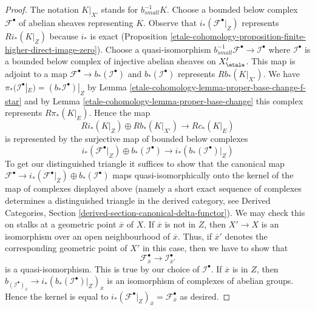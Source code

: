\begin{proof}
The notation $K|_{X'}$ stands for $b_{small}^{-1}K$.
Choose a bounded below complex $\mathcal{F}^\bullet$
of abelian sheaves representing $K$. Observe that
$i_*(\mathcal{F}^\bullet|_Z)$ represents $Ri_*(K|_Z)$
because $i_*$ is exact
(Proposition \ref{etale-cohomology-proposition-finite-higher-direct-image-zero}).
Choose a quasi-isomorphism
$b_{small}^{-1}\mathcal{F}^\bullet \to \mathcal{I}^\bullet$
where $\mathcal{I}^\bullet$ is a bounded below complex of injective
abelian sheaves on $X'_\etale$. This map is adjoint to a map
$\mathcal{F}^\bullet \to b_*(\mathcal{I}^\bullet)$ and
$b_*(\mathcal{I}^\bullet)$ represents $Rb_*(K|_{X'})$.
We have $\pi_*(\mathcal{I}^\bullet|_E) = (b_*\mathcal{I}^\bullet)|_Z$
by Lemma \ref{etale-cohomology-lemma-proper-base-change-f-star} and by
Lemma \ref{etale-cohomology-lemma-proper-base-change} this complex represents
$R\pi_*(K|_E)$. Hence the map
$$
Ri_*(K|_Z) \oplus Rb_*(K|_{X'}) \to Rc_*(K|_E)
$$
is represented by the surjective map of bounded below complexes
$$
i_*(\mathcal{F}^\bullet|_Z) \oplus
b_*(\mathcal{I}^\bullet)
\to
i_*\left(b_*(\mathcal{I}^\bullet)|_Z\right)
$$
To get our distinguished triangle it suffices to show that
the canonical map
$\mathcal{F}^\bullet \to i_*(\mathcal{F}^\bullet|_Z) \oplus
b_*(\mathcal{I}^\bullet)$
maps quasi-isomorphically onto the kernel of the map
of complexes displayed above (namely a short exact sequence
of complexes determines a distinguished triangle in the derived
category, see
Derived Categories, Section \ref{derived-section-canonical-delta-functor}).
We may check this on stalks at a geometric point $\overline{x}$ of $X$.
If $\overline{x}$ is not in $Z$, then $X' \to X$ is an isomorphism
over an open neighbourhood of $\overline{x}$. Thus, if $\overline{x}'$
denotes the corresponding geometric point of $X'$ in this case, then
we have to show that
$$
\mathcal{F}^\bullet_{\overline{x}} \to \mathcal{I}^\bullet_{\overline{x}'}
$$
is a quasi-isomorphism. This is true by our choice of $\mathcal{I}^\bullet$.
If $\overline{x}$ is in $Z$, then
$b_(\mathcal{I}^\bullet)_{\overline{x}} \to
i_*\left(b_*(\mathcal{I}^\bullet)|_Z\right)_{\overline{x}}$
is an isomorphism of complexes of abelian groups. Hence the
kernel is equal to
$i_*(\mathcal{F}^\bullet|_Z)_{\overline{x}} =
\mathcal{F}^\bullet_{\overline{x}}$ as desired.
\end{proof}

